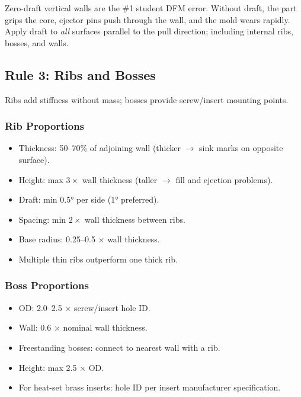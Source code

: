 \begin{warningbox}[Zero-Draft = Stuck Parts]
Zero-draft vertical walls are the \#1 student DFM error. Without draft, the part grips the core, ejector pins push through the wall, and the mold wears rapidly. Apply draft to \emph{all} surfaces parallel to the pull direction; including internal ribs, bosses, and walls.
\end{warningbox}

\subsection{Rule 3: Ribs and Bosses}

Ribs add stiffness without mass; bosses provide screw/insert mounting points.

\subsubsection{Rib Proportions}
\begin{itemize}[nosep,leftmargin=1.5em]
  \item Thickness: 50--70\% of adjoining wall (thicker $\to$ sink marks on opposite surface).
  \item Height: max $3\times$ wall thickness (taller $\to$ fill and ejection problems).
  \item Draft: min \ang{0.5} per side (\ang{1} preferred).
  \item Spacing: min $2\times$ wall thickness between ribs.
  \item Base radius: 0.25--0.5 $\times$ wall thickness.
  \item Multiple thin ribs outperform one thick rib.
\end{itemize}

\subsubsection{Boss Proportions}
\begin{itemize}[nosep,leftmargin=1.5em]
  \item OD: 2.0--2.5 $\times$ screw/insert hole ID.
  \item Wall: 0.6 $\times$ nominal wall thickness.
  \item Freestanding bosses: connect to nearest wall with a rib.
  \item Height: max 2.5 $\times$ OD.
  \item For heat-set brass inserts: hole ID per insert manufacturer specification.
\end{itemize}

